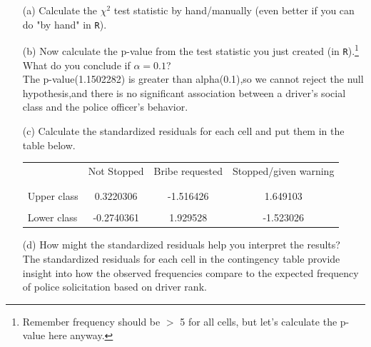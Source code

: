 \documentclass[12pt,letterpaper]{article}
\begin{document}
\begin{enumerate}
	
	\item [(a)]
	Calculate the $\chi^2$ test statistic by hand/manually (even better if you can do "by hand" in \texttt{R}).\\
	 
	\item [(b)]
	Now calculate the p-value from the test statistic you just created (in \texttt{R}).\footnote{Remember frequency should be $>$ 5 for all cells, but let's calculate the p-value here anyway.}  What do you conclude if $\alpha = 0.1$?\\
	 
	The p-value(1.1502282) is greater than alpha(0.1),so we cannot reject the null hypothesis,and there is no significant association between a driver's social class and the police officer's behavior.\\
	
	\item [(c)] Calculate the standardized residuals for each cell and put them in the table below.
	 
	
	\begin{table}[h]
		\centering
		\begin{tabular}{l | c c c }
			& Not Stopped & Bribe requested & Stopped/given warning \\
			\\[-1.8ex] 
			\hline \\[-1.8ex]
			Upper class  &0.3220306  &-1.516426  &1.649103  \\
			\\
			Lower class  &-0.2740361  &1.929528   & -1.523026  \\
			
		\end{tabular}
	\end{table}
	
	
	\vspace{7cm}
	\item [(d)] How might the standardized residuals help you interpret the results?  
	\\   The standardized residuals for each cell in the contingency table provide insight into how the observed frequencies compare to the expected frequency of police solicitation based on driver rank.
	

\end{enumerate}
\end{document}
